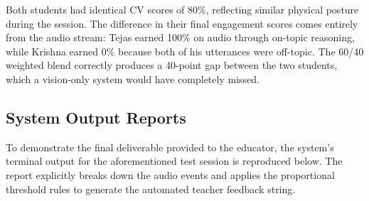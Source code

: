 \documentclass[conference]{IEEEtran}
\begin{document}
Both students had identical CV scores of 80\%, reflecting similar physical posture during the session. The difference in their final engagement scores comes entirely from the audio stream: Tejas earned 100\% on audio through on-topic reasoning, while Krishna earned 0\% because both of his utterances were off-topic. The 60/40 weighted blend correctly produces a 40-point gap between the two students, which a vision-only system would have completely missed.

\subsection{System Output Reports}
To demonstrate the final deliverable provided to the educator, the system's terminal output for the aforementioned test session is reproduced below. The report explicitly breaks down the audio events and applies the proportional threshold rules to generate the automated teacher feedback string.
\end{document}
